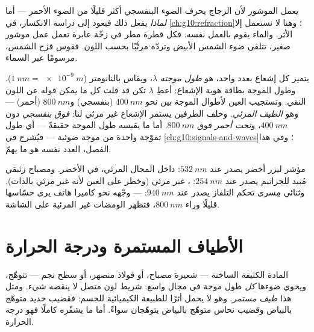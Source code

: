\begin{remark}\label{rem:g10:light-spectra:rainbow}
يعمل الموشور لأن الزجاج يحرف الضوء البنفسجي أكثر قليلًا من الضوء
الأحمر --- أما \emph{لماذا} يفعل ذلك فيعود إلى دراسة الانكسار، في
\cref{ch:g10:refraction}؛ وهنا لا نستعمل إلا الأثر. والماء يقوم بالعمل
نفسه: فكل قطرة مطر في زخّة عابرة تعمل عمل موشور صغير، تتلقى
ضوء الشمس الأبيض وتردّه مرتَّبًا بحسب اللون. فقوس قزح 
الشمس، مرسومًا عبر السماء.
\end{remark}

\begin{definition}\label{def:g10:light-spectra:wavelength}
يتميز كل إشعاع  بعدد واحد، هو
\emph{طول موجته} $\lambda$، ويقاس بالنانومتر
($\qty{1}{nm} = \qty{e-9}{m}$). وطول الموجة بطاقة هوية
الإشعاع: أعطِ $\lambda$ تكن قد قلت كل ما يمكن قوله
عن اللون النقي. وتستجيب العين لأطوال الموجة بين نحو
$\qty{400}{nm}$ (بنفسجي) و$\qty{800}{nm}$ (أحمر) --- وهو \emph{الطيف
المرئي}. وخلف الطرفين يستمر الإشعاع
غير مرئي لنا: \emph{فوق بنفسجي} دون
$\qty{400}{nm}$، و\emph{تحت أحمر} فوق $\qty{800}{nm}$.
أما ما يقيسه طول الموجة حقيقةً --- أي طول تموّجة واحدة من
موجة ضوئية --- فيُشرح في \cref{ch:g10:signals-and-waves}؛ وفي هذا
الفصل، العدد نفسه هو ما يهمّ.
\end{definition}

\begin{example}\label{ex:g10:light-spectra:classify}
مؤشر ليزر أخضر يصدر عند $\qty{532}{nm}$: داخل المجال المرئي،
في الأخضر. ومصباح زئبقي مُبيد للجراثيم يصدر عند $\qty{254}{nm}$:
، غير مرئي (وخطر على العين لأنه غير مرئي
بالذات). وثنائي مِسرى تحكم التلفاز يصدر عند $\qty{940}{nm}$:
 --- وجّهه نحو كاميرا هاتف يرى حسّاسها قليلًا وراء
$\qty{800}{nm}$، فتظهر الومضات غير المرئية على الشاشة.
\end{example}

\section{الأطياف المستمرة ودرجة الحرارة}

\begin{definition}\label{def:g10:light-spectra:continuous}
المادة الكثيفة الساخنة --- شعيرة مصباح، أو فولاذ منصهر، أو سطح
نجم --- تتوهّج، ويحوي ضوءها \emph{كل} طول موجة في
مجال واسع: شريط لون متصل لا ينقصه شيء. ومثل هذا
 \emph{طيف مستمر}. وهو
لا يحمل أثرًا للطبيعة الكيميائية للجسم: فقضيب حديد متوهّج بالبياض
وقضيب نحاس متوهّج بالبياض يتوهّجان سواءً. أما ما يشفّره كاملًا
فهو درجة الحرارة.
\end{definition}

